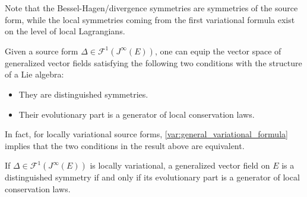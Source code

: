    \begin{remark}
        Note that the Bessel-Hagen/divergence symmetries are symmetries of the source form, while the local symmetries coming from the first variational formula exist on the level of local Lagrangians.
    \end{remark}

    \begin{property}
        Given a source form $\Delta\in\mathcal{F}^1(J^\infty(E))$, one can equip the vector space of generalized vector fields satisfying the following two conditions with the structure of a Lie algebra:
        \begin{itemize}
            \item They are distinguished symmetries.
            \item Their evolutionary part is a generator of local conservation laws.
        \end{itemize}
    \end{property}

    In fact, for locally variational source forms, \cref{var:general_variational_formula} implies that the two conditions in the result above are equivalent.
    \begin{theorem}[Noether]
        If $\Delta\in\mathcal{F}^1(J^\infty(E))$ is locally variational, a generalized vector field on $E$ is a distinguished symmetry if and only if its evolutionary part is a generator of local conservation laws.
    \end{theorem}



